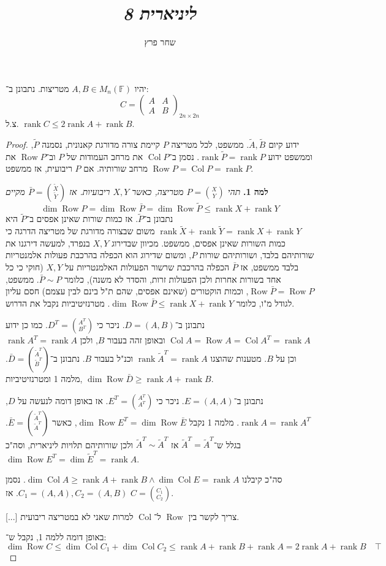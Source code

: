 \documentclass[]{article}
\author{שחר פרץ}
\title{\textit{ליניארית 8}}
\DeclareMathOperator\col   {Col}
\newcommand\F         {\mathbb{F}}
\newcommand\pms[1]    {\begin{pmatrix}
		#1
\end{pmatrix}}
\DeclareMathOperator{\rk}     {rank}
\DeclareMathOperator{\cols}   {Col}
\DeclareMathOperator{\rows}   {Row}
\newcommand\tl    {\tilde}
\begin{document}
	\maketitle
	\section{}
	יהיו $A, B \in M_n(\F)$ מטריצות. נתבונן ב־: 
	\[ C = \pms{A & A \\ A & B}_{2n \times 2n} \]
	צ.ל. $\rk C \le 2\rk A + \rk B$. 
	\begin{proof}
			ידוע קיום $\tl A, \tl B$. ממשפט, לכל מטריצה $P$ קיימת צורה מדורגת קאנונית, נסמנה $\tl P$, וממשפט ידוע $\rk \tl P = \rk P$. נסמן ב־$\cols P$ את מרחב העמודות של $P$ וב־$\rows P$ את מרחב שורותיה. אם $P$ ריבועית, אז ממשפט $\rows P = \cols P = \rk P$. 
			
			
			
			\textbf{למה 1. }\textit{תהי $P = \binom{X}{Y}$ מטריצה, כאשר $X, Y$ ריבועיות. אז $\bar P = \binom{\tl X }{\tl Y}$ מקיים }
			\[\dim \rows P = \dim \rows \bar P = \dim \rows \tl P \le \rk X + \rk Y\]
			נתבונן ב־$\tl P$. 
			אז כמות שורות שאינן אפסים ב־$\tl P$ היא $\rk \tl X + \rk \tl Y = \rk X + \rk Y$ משום שבצורה מדורגת של מטריצה הדרגה כי כמות השורות שאינן אפסים, ממשפט. מכיוון שבדירוג $X, Y$ בנפרד, למעשה דירגנו את שורותיהם בלבד, ושורותיהם שורות $P$, ומשום שדירוג הוא הכפלה בהרכבת פעולות אלמנטריות בלבד ממשפט, אז $\bar P$ הכפלה בהרכבת שרשור הפעולות האלמנטריות על $X, Y$ (חוקי כי כל אחד בשורות אחרות ולכן הפעולות זרות, והסדר לא משנה), כלומר $\bar P \sim P$. ממשפט, $\rows \bar P = \rows P$, וכמות הוקטורים (שאינם אפסים, שהם ת"ל בינם לבין עצמם) חסם עליון לגודל מ"ו, כלומר $\dim \rows \bar P \le \rk X + \rk Y$. מטרנזיטיביות נקבל את הדרוש. 
			
			נתבונן ב־$D = (A, B)$. ניכר כי $D^T = \binom{A^T}{B^T}$. כמו כן ידוע $\cols A = \rows A = \cols A^T = \rk A$ ובאופן זהה בעבור $B$, ולכן $\rk A^T = \rk A$ וכן על $B$. מטענות שהוצגו $\rk \tl A^T = \rk A$ וכנ"ל בעבור $B$. נתבונן ב־$\bar D = \binom{\tl A^T}{\tl B^T}$. מלמה 1 ומטרנזיטיביות, $\dim \rows \bar D \ge \rk A + \rk B$. 
			
			נתבונן ב־$E = (A, A)$. ניכר כי $E^T = \binom{A^T}{A^T}$. אז באופן דומה לנעשה על $D$, $\rk A = \rk A^T$. מלמה 1 נקבל $\dim \rows E^T = \dim \rows \bar E$, כאשר $\bar E = \binom{\tl A^T}{\tl A^T}$. בגלל ש־$\tl A^T = \tl A^T$ אז $\tl A^T \sim \tl A^T$ ולכן שורותיהם תלויות ליניארית, וסה"כ $\dim \rows E^T = \dim \tl E^T = \rk A$. 
			
			סה"כ קיבלנו $\dim \col A \ge \rk A + \rk B \land \dim \col E = \rk A$. נסמן $C_1 = (A, A), C_2 = (A, B)$. אז $C = \binom{C_1}{C_2}$. 
			
			[...] צריך לקשר בין $\rows$ ל־$\cols$ למרות שאני לא במטריצה ריבועית. 
			
			באופן דומה ללמה 1, נקבל ש־: 
			\[ \dim \rows C \le \dim \col C_1 + \dim \col C_2 \le \rk A + \rk B + \rk A = 2\rk A + \rk B \quad \top \]
	\end{proof}
	
\end{document}
